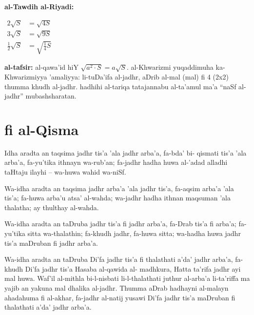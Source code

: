 \documentclass[11pt,a4paper]{book}
\begin{document}
\begin{mathexplain}
\textbf{al-Tawdih al-Riyadi:}

\begin{center}
$\begin{aligned}
  2\sqrt{S} &= \sqrt{4S} \\
  3\sqrt{S} &= \sqrt{9S} \\
  \tfrac{1}{2}\sqrt{S} &= \sqrt{\tfrac{1}{4}S}
\end{aligned}$
\end{center}

\textbf{al-tafsir:} al-qawa'id hiY $\sqrt{a^2 \cdot S} = a\sqrt{S}$.
al-Khwarizmi yuqaddimuha ka-Khwarizmiyya 'amaliyya: li-tuDa'ifa
al-jadhr, aDrib al-mal (mal) fi 4 (2x2) thumma khudh al-jadhr.
hadhihi al-tariqa tatajannabu al-ta'amul ma'a ``naSf al-jadhr''
mubashsharatan.
\end{mathexplain}

\newpage

\chapter{fi al-Qisma}
\label{ch:division}

\begin{originaltext}
Idha aradta an taqsima jadhr tis'a 'ala jadhr arba'a, fa-bda' bi-
qismati tis'a 'ala arba'a, fa-yu'tika ithnayn wa-rub'an; fa-jadhr
hadha huwa al-'adad alladhi taHtaju ilayhi -- wa-huwa wahid wa-niSf.

Wa-idha aradta an taqsima jadhr arba'a 'ala jadhr tis'a, fa-aqsim
arba'a 'ala tis'a; fa-huwa arba'u atsa' al-wahda; wa-jadhr hadha
ithnan maqsuman 'ala thalatha; ay thulthay al-wahda.

Wa-idha aradta an taDruba jadhr tis'a fi jadhr arba'a, fa-Drab
tis'a fi arba'a; fa-yu'tika sitta wa-thalathin; fa-khudh jadhr,
fa-huwa sitta; wa-hadha huwa jadhr tis'a maDruban fi jadhr arba'a.

Wa-idha aradta an taDruba Di'fa jadhr tis'a fi thalathati a'da'
jadhr arba'a, fa-khudh Di'fa jadhr tis'a Hasaba al-qawida al-
madhkura, Hatta ta'rifa jadhr ayi mal huwa. Waf'il al-mithla
bi-l-nisbati li-l-thalathati juthur al-arba'a li-ta'riffa ma yajib
an yakuna mal dhalika al-jadhr. Thumma aDrab hadhayni al-malayn
ahadahuma fi al-akhar, fa-jadhr al-natij yusawi Di'fa jadhr tis'a
maDruban fi thalathati a'da' jadhr arba'a.
\end{originaltext}
\end{document}
